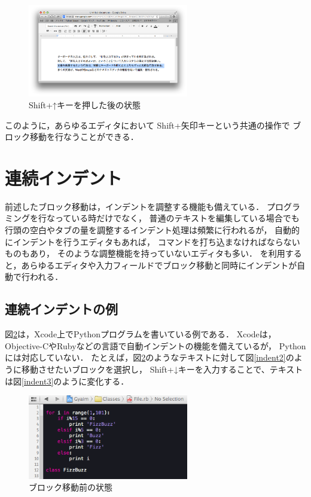 \begin{figure}[H]
\centerline{\includegraphics[width=70mm,bb=0 0 935 542]{figures/block5.png}}
\caption{Shift+↑キーを押した後の状態}
\label{move4}
\end{figure}

このように，あらゆるエディタにおいて
Shift+矢印キーという共通の操作で
ブロック移動を行なうことができる．

\section{連続インデント}

前述したブロック移動は，インデントを調整する機能も備えている．
プログラミングを行なっている時だけでなく，
普通のテキストを編集している場合でも
行頭の空白やタブの量を調整するインデント処理は頻繁に行われるが，
自動的にインデントを行うエディタもあれば，
コマンドを打ち込まなければならないものもあり，
そのような調整機能を持っていないエディタも多い．
{\system}を利用すると，あらゆるエディタや入力フィールドでブロック移動と同時にインデントが自動で行われる．

\subsection{連続インデントの例}
図\ref{indent1}は，Xcode上でPythonプログラムを書いている例である．
Xcodeは，Objective-CやRubyなどの言語で自動インデントの機能を備えているが，
Pythonには対応していない．
たとえば，図\ref{indent1}のようなテキストに対して図\ref{indent2}のように移動させたいブロックを選択し，
Shift+↓キーを入力することで、テキストは図\ref{indent3}のように変化する．

\begin{figure}[H]
\centerline{\includegraphics[width=70mm,bb=0 0 360 190]{figures/indent1.png}}
\caption{ブロック移動前の状態}
\label{indent1}
\end{figure}


